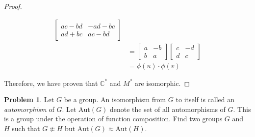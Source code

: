 \documentclass[12pt,reqno]{article}
\newcommand{\C}{\mathbb{C}}
\theoremstyle{plain}
\theoremstyle{definition}
\newtheorem{problem}{Problem}
\begin{document}
\begin{proof}
\begin{itemize}
\begin{align*}
\begin{bmatrix}
            ac-bd & -ad-bc\\
            ad+bc & ac-bd
        \end{bmatrix}\\
        &= \begin{bmatrix}
            a & -b\\
            b & a
        \end{bmatrix}
        \begin{bmatrix}
            c & -d\\
            d & c
        \end{bmatrix}\\
        &= \phi(u)\cdot\phi(v)
    \end{align*}
    \end{itemize}
    Therefore, we have proven that \(\C^*\) and \(M^*\) are isomorphic.
\end{proof}

\newpage


\begin{problem} Let $G$ be a group. An isomorphism from $G$ to itself is called an \emph{automorphism} of $G$. Let $\mathrm{Aut}(G)$ denote the set of all automorphisms of $G$. This is a group under the operation of function composition.
    Find two groups $G$ and $H$ such that $G \not \approx H$ but $\mathrm{Aut}(G) \approx \mathrm{Aut}(H)$.
\end{problem}
\end{document}
